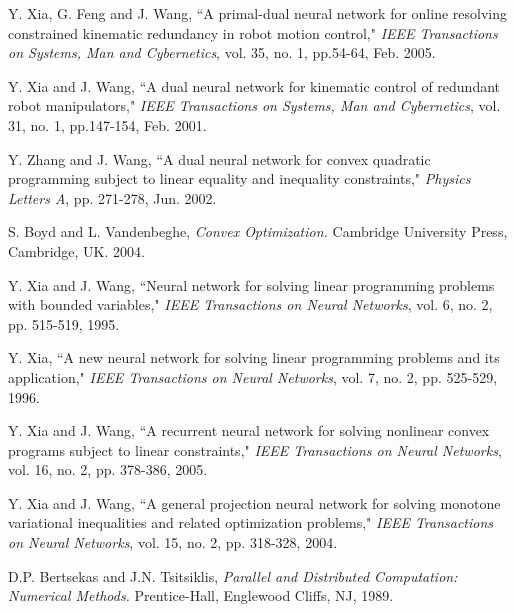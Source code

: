 \documentclass[conference]{IEEEtran}
\begin{document}
\begin{thebibliography}{1}
 Y. Xia, G. Feng and J. Wang, ``A primal-dual neural network for online resolving constrained kinematic redundancy in robot motion control,"
        {\it IEEE Transactions on Systems, Man and Cybernetics}, vol. 35, no. 1, pp.54-64, Feb. 2005.

 Y. Xia and J. Wang, ``A dual neural network for kinematic control of redundant robot manipulators,"
        {\it IEEE Transactions on Systems, Man and Cybernetics}, vol. 31, no. 1, pp.147-154, Feb. 2001.

 Y. Zhang and J. Wang, ``A dual neural network for convex quadratic programming subject to linear equality and inequality constraints,"
        {\it Physics Letters A}, pp. 271-278, Jun. 2002.

 S. Boyd and L. Vandenbeghe,
        {\it Convex Optimization.}
        Cambridge University Press, Cambridge, UK. 2004.

 Y. Xia and J. Wang, ``Neural network for solving linear programming problems with bounded variables,"
        {\it IEEE Transactions on Neural Networks}, vol. 6, no. 2, pp. 515-519, 1995.

 Y. Xia, ``A new neural network for solving linear programming problems and its application,"
        {\it IEEE Transactions on Neural Networks}, vol. 7, no. 2, pp. 525-529, 1996.

 Y. Xia and J. Wang, ``A recurrent neural network for solving nonlinear convex programs subject to linear constraints,"
        {\it IEEE Transactions on Neural Networks}, vol. 16, no. 2, pp. 378-386, 2005.

 Y. Xia and J. Wang, ``A general projection neural network for solving monotone variational inequalities and related optimization problems,"
        {\it IEEE Transactions on Neural Networks}, vol. 15, no. 2, pp. 318-328, 2004.



 D.P. Bertsekas and J.N. Tsitsiklis,
        {\it Parallel and Distributed Computation: Numerical Methods.}
        Prentice-Hall, Englewood Cliffs, NJ, 1989.



\end{thebibliography}

\end{document}
